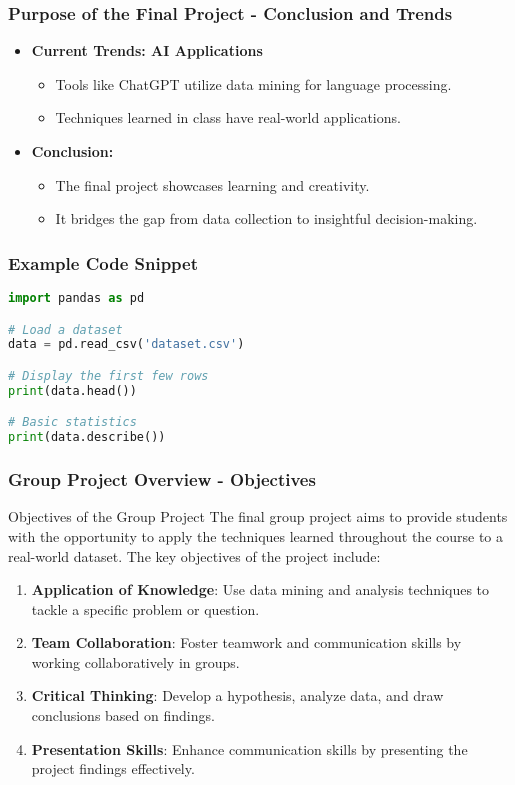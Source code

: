 \documentclass[aspectratio=169]{beamer}
\begin{document}
\begin{frame}[fragile]
    \frametitle{Purpose of the Final Project - Conclusion and Trends}
    \begin{itemize}
        \item \textbf{Current Trends: AI Applications}
            \begin{itemize}
                \item Tools like ChatGPT utilize data mining for language processing.
                \item Techniques learned in class have real-world applications.
            \end{itemize}
        \item \textbf{Conclusion:}
            \begin{itemize}
                \item The final project showcases learning and creativity.
                \item It bridges the gap from data collection to insightful decision-making.
            \end{itemize}
    \end{itemize}
\end{frame}

\begin{frame}[fragile]
    \frametitle{Example Code Snippet}
    \begin{lstlisting}[language=Python]
import pandas as pd

# Load a dataset
data = pd.read_csv('dataset.csv')

# Display the first few rows
print(data.head())

# Basic statistics
print(data.describe())
    \end{lstlisting}
\end{frame}

\begin{frame}[fragile]
    \frametitle{Group Project Overview - Objectives}
    \begin{block}{Objectives of the Group Project}
        The final group project aims to provide students with the opportunity to apply the techniques learned throughout the course to a real-world dataset. The key objectives of the project include:
    \end{block}
    \begin{enumerate}
        \item \textbf{Application of Knowledge}: Use data mining and analysis techniques to tackle a specific problem or question.
        \item \textbf{Team Collaboration}: Foster teamwork and communication skills by working collaboratively in groups.
        \item \textbf{Critical Thinking}: Develop a hypothesis, analyze data, and draw conclusions based on findings.
        \item \textbf{Presentation Skills}: Enhance communication skills by presenting the project findings effectively.
    \end{enumerate}
\end{frame}
\end{document}
